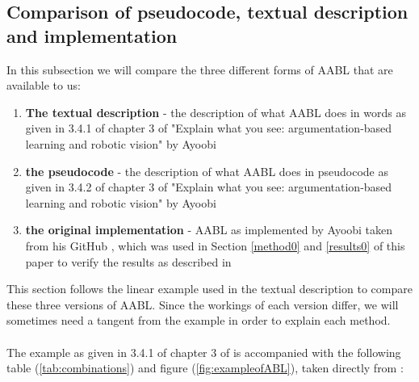 \documentclass{article}
\begin{document}
\subsection{Comparison of pseudocode, textual description and implementation}
In this subsection we will compare the three different forms of AABL that are available to us:
\begin{enumerate}
    \item \textbf{The textual description }- the description of what AABL does in words as given in 3.4.1 of chapter 3 of \cite{ayoobi2023fullthesis} "Explain what you see: argumentation-based learning and robotic vision" by Ayoobi
    \item \textbf{the pseudocode} - the description of what AABL does in pseudocode as given in 3.4.2 of chapter 3 of \cite{ayoobi2023fullthesis} "Explain what you see: argumentation-based learning and robotic vision" by Ayoobi
    \item \textbf{the original implementation }- AABL as implemented by Ayoobi taken from his GitHub \cite{ayoobiGithub}, which was used in Section \ref{method0} and \ref{results0} of this paper to verify the results as described in \cite{ayoobi2021argue}
\end{enumerate}
This section follows the linear example used in the textual description to compare these three versions of AABL. Since the workings of each version differ, we will sometimes need a tangent from the example in order to explain each method. \\\\
The example as given in 3.4.1 of chapter 3 of \cite{ayoobi2023fullthesis} is accompanied with the following table (\ref{tab:combinations}) and figure (\ref{fig:exampleofABL}), taken directly from \cite{ayoobi2023fullthesis}: 
\end{document}
